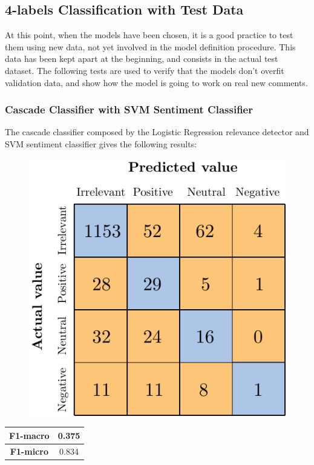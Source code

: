 \subsection{4-labels Classification with Test Data}

At this point, when the models have been chosen, it is a good practice to test them using new data, not yet involved in the model definition procedure. This data has been kept apart at the beginning, and consists in the actual test dataset. The following tests are used to verify that the models don't overfit validation data, and show how the model is going to work on real new comments.


\subsubsection{Cascade Classifier with SVM Sentiment Classifier}

The cascade classifier composed by the Logistic Regression relevance detector and SVM sentiment classifier gives the following results:

\begin{figure}[H]
	\centering
	\includegraphics[scale=1]{figures/conf_matrices/ita_cascade_svm/ita_cascade_svm_tst.pdf}
	\label{fig:ita_cascade_svm_tst}
\end{figure}

\begin{center}
	\begin{tabular}{ | c | c | } 
		\hline
		\textbf{F1-macro} & 0.375 \\
		\hline
		\textbf{F1-micro} & 0.834 \\ 
		\hline
	\end{tabular}
\end{center}

